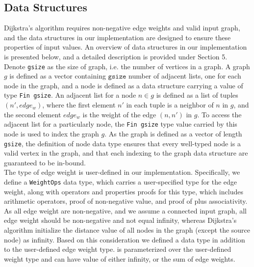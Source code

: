 \subsection{Data Structures}
Dijkstra's algorithm requires non-negative edge weights and valid input graph, and the data structures in our implementation are designed to ensure these properties of input values. An overview of data structures in our implementation is presented below, and a detailed description is provided under Section 5. 
\\

Denote \texttt{gsize} as the size of graph, i.e. the number of vertices in a graph. A graph $g$ is defined as a vector containing $\texttt{gsize}$ number of adjacent lists, one for each node in the graph, and a node is defined as a data structure carrying a value of type \texttt{Fin gsize}. An adjacent list for a node $n \in g$ is defined as a list of tuples $(n', edge_w)$, where the first element $n'$ in each tuple is a neighbor of $n$ in $g$, and the second element $edge_w$ is the weight of the edge $(n, n')$ in $g$. To access the adjacent list for a particularly node, the \texttt{Fin gsize} type value carried by this node is used to index the graph $g$. As the graph is defined as a vector of length \texttt{gsize}, the definition of node data type ensures that every well-typed node is a valid vertex in the graph, and that each indexing to the graph data structure are guaranteed to be in-bound.
\\

The type of edge weight is user-defined in our implementation. Specifically, we define a \texttt{WeightOps} data type, which carries a user-specified type for the edge weight, along with operators and properties proofs for this type, which includes arithmetic operators, proof of non-negative value, and proof of plus associativity. As all edge weight are non-negative, and we assume a connected input graph, all edge weight should be non-negative and not equal infinity, whereas Dijkstra's algorithm initialize the distance value of all nodes in the graph (except the source node) as infinity. Based on this consideration we defined a  data type in addition to the user-defined edge weight type.  is parameterized over the user-defined weight type and can have value of either infinity, or the sum of edge weights. 

